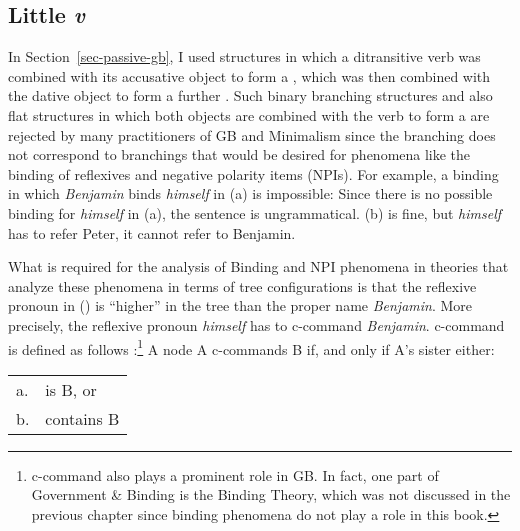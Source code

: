 \subsection{Little \textit{v}}
\label{sec-little-v}

In Section~\ref{sec-passive-gb}, I used \xbar structures in
which a ditransitive verb was combined with its accusative object to form a \vbar, which was then
combined with the dative object to form a further \vbar. Such binary branching structures and also
flat structures in which both objects are combined with the verb to form a \vbar are rejected by
many practitioners of GB and Minimalism since the branching does not correspond to branchings that
would be desired for phenomena like the binding of reflexives and negative polarity items (NPIs). For example, a binding in which \emph{Benjamin} binds \emph{himself} in (a) is impossible:
\eal
{}
\zl
Since there is no possible binding for \emph{himself} in (a), the sentence is
ungrammatical. (b) is fine, but \emph{himself} has to refer Peter, it cannot refer to
Benjamin.

What is required for the analysis of Binding and NPI phenomena in theories that analyze these
phenomena in terms of tree configurations is that the reflexive pronoun in () is ``higher'' in the tree than
the proper name \emph{Benjamin}. More precisely, the reflexive pronoun \emph{himself} has to
c-command \emph{Benjamin}. c-command is defined as follows \citep[]{Adger2003a}:\footnote{%
  c-command also plays a prominent role in GB. In fact, one part of Government \& Binding is the
  Binding Theory, which was not discussed in the previous chapter since binding phenomena do not
  play a role in this book.
}
\ea
A node A c-commands B if, and only if A's sister either:\\
\begin{tabular}[t]{@{}l@{~}l@{}}
a. & is B, or\\
b. & contains B
\end{tabular}
\z

